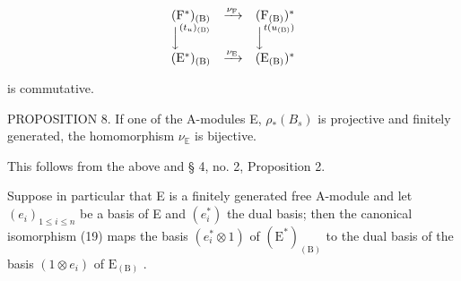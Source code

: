 \[
\begin{array}{c c c} (\mathrm{F} ^ {*}) _ {(\mathrm{B})} & \xrightarrow {\nu_ {\mathrm{F}}} & (\mathrm{F} _ {(\mathrm{B})}) ^ {*} \\ \Big \downarrow^ {(t _ {u}) _ {(\mathrm{B})}} & & \Big \downarrow^ {t (u _ {(\mathrm{B})})} \\ (\mathrm{E} ^ {*}) _ {(\mathrm{B})} & \xrightarrow {\nu_ {\mathrm{E}}} & (\mathrm{E} _ {(\mathrm{B})}) ^ {*} \end{array}
\]

is commutative.

PROPOSITION 8. If one of the A-modules E, \(\rho_{*}(B_{s})\) is projective and finitely generated, the homomorphism \(\nu_{\mathbb{E}}\) is bijective.

This follows from the above and § 4, no. 2, Proposition 2.

Suppose in particular that E is a finitely generated free A-module and let \((e_{i})_{1\leqslant i\leqslant n}\) be a basis of E and \((e_{i}^{*})\) the dual basis; then the canonical isomorphism (19) maps the basis \((e_{i}^{*}\otimes1)\) of \((\mathrm{E}^{*})_{(\mathrm{B})}\) to the dual basis of the basis \((1\otimes e_{i})\) of \(\mathrm{E}_{(\mathrm{B})}\) .


